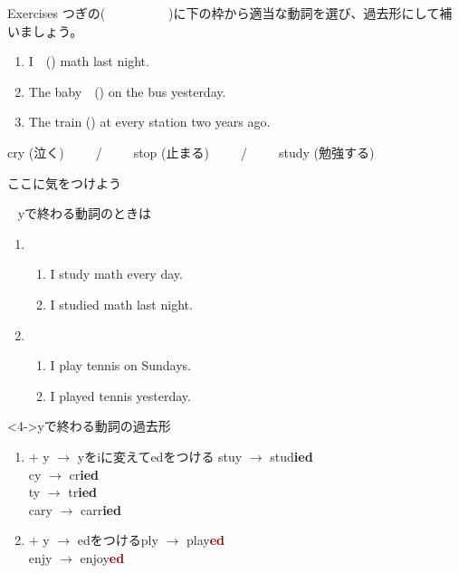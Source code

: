 \documentclass[aspectratio=169,xcolor={dvipsnames,table}]{beamer}
\newcommand{\myaudio}[1]{\href{#1}{\faVolumeUp}}
\begin{document}
\begin{frame}[plain]{Exercises}
つぎの(~~~~~~~~~~)に下の枠から適当な動詞を選び、過去形にして補いましょう。 

\begin{enumerate}
	\item I~~() math last night.         
 \item The baby~~() on the bus yesterday.
	\item The train () at every station two years ago.
\end{enumerate}

\begin{tcolorbox}[title=この中から選んでください]
\centering
cry (泣く)~~~~~/~~~~~stop (止まる)~~~~~/~~~~~study (勉強する)
\end{tcolorbox}
\hfill\myaudio{./audio/025_past_do_10.mp3}

\end{frame}
\begin{frame}[plain]{ここに気をつけよう}
 
\dbend\,\,\,\,\,yで終わる動詞のときは

\begin{enumerate}
 \item<1-> \begin{enumerate}
	\item<1-> I study math every day.
	\item<2-> I studied math last night.
       \end{enumerate}
 \item<1-> \begin{enumerate}
	\item<1-> I play tennis on Sundays.
	\item<3-> I played tennis yesterday.
       \end{enumerate}
\end{enumerate}

\begin{block}<4->{yで終わる動詞の過去形}\small
 \begin{enumerate}
  \item<5->  $+$ y $\longrightarrow$ yをiに変えてedをつける%
\hfill{}stuy $\rightarrow$ stud\textcolor{NavyBlue}{\bfseries ied}\\
\hfill{}cy $\rightarrow$ cr\textcolor{NavyBlue}{\bfseries ied}\\
\hfill{}ty $\rightarrow$ tr\textcolor{NavyBlue}{\bfseries ied}\\
\hfill{}cary $\rightarrow$ carr\textcolor{NavyBlue}{\bfseries ied}
  \item<6->  $+$ y $\longrightarrow$ edをつける\hfill{}ply $\rightarrow$ play\textcolor{Maroon}{\bfseries ed}\\
\hfill{}enjy $\rightarrow$ enjoy\textcolor{Maroon}{\bfseries ed}
 \end{enumerate}
\end{block}
\end{frame}
\end{document}
